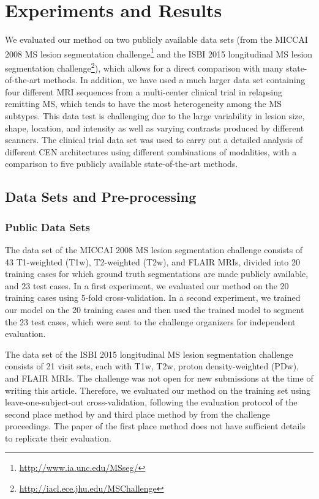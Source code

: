 
\section[Experiments and results]{Experiments and Results}

We evaluated our method on two publicly available data sets (from the MICCAI
2008 MS lesion segmentation
challenge\footnote{\url{http://www.ia.unc.edu/MSseg/}} and the ISBI 2015
longitudinal MS lesion segmentation
challenge\footnote{\url{http://iacl.ece.jhu.edu/MSChallenge}}), which allows for
a direct comparison with many state-of-the-art methods. In addition, we have
used a much larger data set containing four different MRI sequences from a
multi-center clinical trial in relapsing remitting MS, which tends to have the
most heterogeneity among the MS subtypes. This data test is challenging due to
the large variability in lesion size, shape, location, and intensity as well as
varying contrasts produced by different scanners. The clinical trial data set
was used to carry out a detailed analysis of different CEN architectures using
different combinations of modalities, with a comparison to five publicly
available state-of-the-art methods.

\subsection[Data sets and pre-processing]{Data Sets and Pre-processing}

\subsubsection{Public Data Sets}
The data set of the MICCAI 2008 MS lesion segmentation challenge
\citep{styner20083d} consists of 43 T1-weighted (T1w), T2-weighted (T2w), and
FLAIR MRIs, divided into 20 training cases for which ground truth segmentations
are made publicly available, and 23 test cases. In a first experiment, we
evaluated our method on the 20 training cases using 5-fold cross-validation. In
a second experiment, we trained our model on the 20 training cases and then used
the trained model to segment the 23 test cases, which were sent to the challenge
organizers for independent evaluation.

The data set of the ISBI 2015 longitudinal MS lesion segmentation challenge
consists of 21 visit sets, each with T1w, T2w, proton density-weighted (PDw),
and FLAIR MRIs. The challenge was not open for new submissions at the time of
writing this article. Therefore, we evaluated our method on the training set
using leave-one-subject-out cross-validation, following the evaluation protocol
of the second place method by \cite{jesson2015} and third place method by
\cite{maier2015} from the challenge proceedings. The paper of the first place
method does not have sufficient details to replicate their evaluation.

